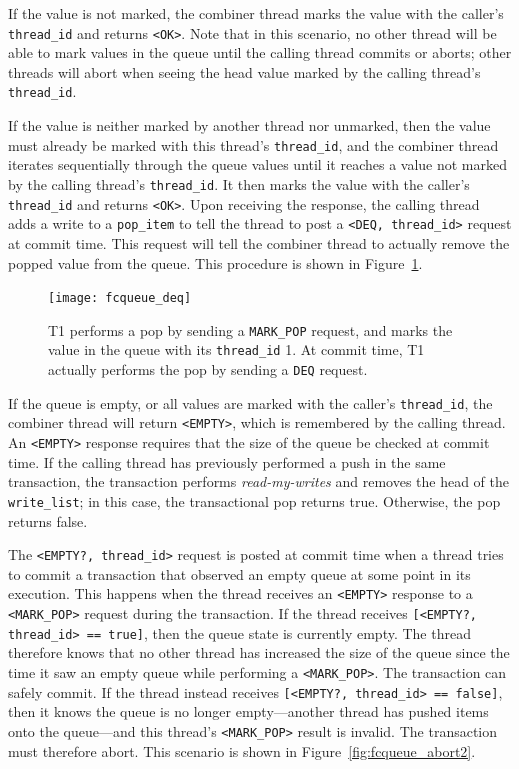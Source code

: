 If the value is not marked, the combiner thread marks the value with the caller's \texttt{thread\_id} and returns \texttt{<OK>}. Note that in this scenario, no other thread will be able to mark values in the queue until the calling thread commits or aborts; other threads will abort when seeing the head value marked by the calling thread's \texttt{thread\_id}. 

If the value is neither marked by another thread nor unmarked, then the value must already be marked with this thread's \texttt{thread\_id}, and the combiner thread iterates sequentially through the queue values until it reaches a value not marked by the calling thread's \texttt{thread\_id}. It then marks the value with the caller's \texttt{thread\_id} and returns \texttt{<OK>}. Upon receiving the response, the calling thread adds a write to a \texttt{pop\_item} to tell the thread to post a \texttt{<DEQ, thread\_id>} request at commit time. This request will tell the combiner thread to actually remove the popped value from the queue. This procedure is shown in Figure~\ref{fig:fcqueue_deq}.

\begin{figure}[t]
\centering
\texttt{[image: fcqueue\_deq]}
    \caption[Transactional flat combining pop request execution]{T1 performs a pop by sending a \texttt{MARK\_POP} request, and marks the value in the queue with its \texttt{thread\_id} 1. At commit time, T1 actually performs the pop by sending a \texttt{DEQ} request.} 
\label{fig:fcqueue_deq}
\end{figure}

If the queue is empty, or all values are marked with the caller's \texttt{thread\_id}, the combiner thread will return \texttt{<EMPTY>}, which is remembered by the calling thread. An \texttt{<EMPTY>} response requires that the size of the queue be checked at commit time. If the calling thread has previously performed a push in the same transaction, the transaction performs \emph{read-my-writes} and removes the head of the \texttt{write\_list}; in this case, the transactional pop returns true. Otherwise, the pop returns false.

The \texttt{<EMPTY?, thread\_id>} request is posted at commit time when a thread tries to commit a transaction that observed an empty queue at some point in its execution. This happens when the thread receives an \texttt{<EMPTY>} response to a \texttt{<MARK\_POP>} request during the transaction. If the thread receives \texttt{[<EMPTY?, thread\_id> == true]}, then the queue state is currently empty.
The thread therefore knows that no other thread has increased the size of the queue since the time it saw an empty queue while performing a \texttt{<MARK\_POP>}. The transaction can safely commit. If the thread instead receives \texttt{[<EMPTY?, thread\_id> == false]}, then it knows the queue is no longer empty---another thread has pushed items onto the queue---and this thread's \texttt{<MARK\_POP>} result is invalid. The transaction must therefore abort. This scenario is shown in Figure~\ref{fig:fcqueue_abort2}.

